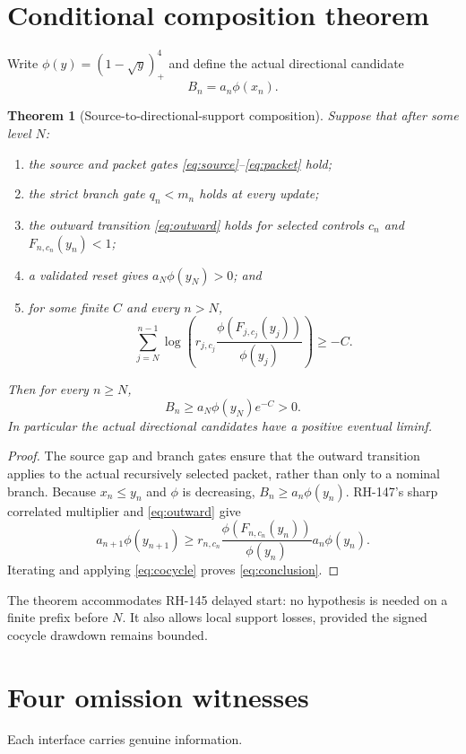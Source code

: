 \documentclass[12pt]{article}
\newtheorem{theorem}{Theorem}
\begin{document}
\section{Conditional composition theorem}
Write $\phi(y)=(1-\sqrt y)_+^4$ and define the actual directional candidate
\[
 B_n=a_n\phi(x_n).
\]

\begin{theorem}[Source-to-directional-support composition]\label{thm:composition}
Suppose that after some level $N$:
\begin{enumerate}
\item the source and packet gates \eqref{eq:source}--\eqref{eq:packet} hold;
\item the strict branch gate $q_n<m_n$ holds at every update;
\item the outward transition \eqref{eq:outward} holds for selected controls
$c_n$ and $F_{n,c_n}(y_n)<1$;
\item a validated reset gives $a_N\phi(y_N)>0$; and
\item for some finite $C$ and every $n>N$,
\begin{equation}\label{eq:cocycle}
 \sum_{j=N}^{n-1}\log\!\left(
 r_{j,c_j}\frac{\phi(F_{j,c_j}(y_j))}{\phi(y_j)}
 \right)\geq-C.
\end{equation}
\end{enumerate}
Then for every $n\geq N$,
\begin{equation}\label{eq:conclusion}
 B_n\geq a_N\phi(y_N)e^{-C}>0.
\end{equation}
In particular the actual directional candidates have a positive eventual
liminf.
\end{theorem}

\begin{proof}
The source gap and branch gates ensure that the outward transition applies to
the actual recursively selected packet, rather than only to a nominal branch.
Because $x_n\leq y_n$ and $\phi$ is decreasing,
$B_n\geq a_n\phi(y_n)$.  RH-147's sharp correlated multiplier and
\eqref{eq:outward} give
\[
 a_{n+1}\phi(y_{n+1})\geq
 r_{n,c_n}\frac{\phi(F_{n,c_n}(y_n))}{\phi(y_n)}
 a_n\phi(y_n).
\]
Iterating and applying \eqref{eq:cocycle} proves \eqref{eq:conclusion}.
\end{proof}

The theorem accommodates RH-145 delayed start: no hypothesis is needed on a
finite prefix before $N$.  It also allows local support losses, provided the
signed cocycle drawdown remains bounded.

\section{Four omission witnesses}
Each interface carries genuine information.
\end{document}
